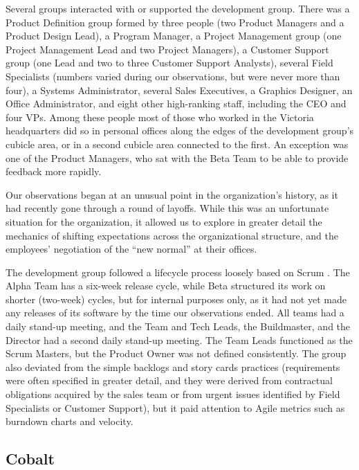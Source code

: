 \documentclass[10pt, conference, compsocconf]{IEEEtran}
\begin{document}
Several groups interacted with or supported the development group. There was a Product Definition group formed by three people (two Product Managers and a Product Design Lead), a Program Manager, a Project Management group (one Project Management Lead and two Project Managers), a Customer Support group (one Lead and two to three Customer Support Analysts), several Field Specialists (numbers varied during our observations, but were never more than four), a Systems Administrator, several Sales Executives, a Graphics Designer, an Office Administrator, and eight other high-ranking staff, including the CEO and four VPs. Among these people most of those who worked in the Victoria headquarters did so in personal offices along the edges of the development group's cubicle area, or in a second cubicle area connected to the first. An exception was one of the Product Managers, who sat with the Beta Team to be able to provide feedback more rapidly.

Our observations began at an unusual point in the organization's history, as it had recently gone through a round of layoffs. While this was an unfortunate situation for the organization, it allowed us to explore in greater detail the mechanics of shifting expectations across the organizational structure, and the employees' negotiation of the ``new normal'' at their offices.

The development group followed a lifecycle process loosely based on Scrum \cite{Schwaber2001}. The Alpha Team has a six-week release cycle, while Beta structured its work on shorter (two-week) cycles, but for internal purposes only, as it had not yet made any releases of its software by the time our observations ended. All teams had a daily stand-up meeting, and the Team and Tech Leads, the Buildmaster, and the Director had a second daily stand-up meeting. The Team Leads functioned as the Scrum Masters, but the Product Owner was not defined consistently. The group also deviated from the simple backlogs and story cards practices (requirements were often specified in greater detail, and they were derived from contractual obligations acquired by the sales team or from urgent issues identified by Field Specialists or Customer Support), but it paid attention to Agile metrics such as burndown charts and velocity.



\subsection{Cobalt}
\end{document}
